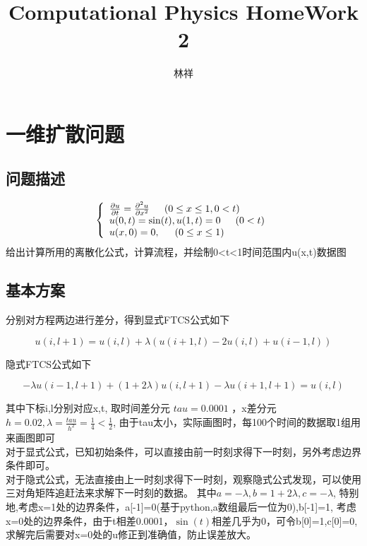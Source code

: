 \documentclass[11pt]{ctexart}
\title{Computational Physics HomeWork 2}
\author{林祥}
\begin{document}
\maketitle

\section{一维扩散问题}

\subsection{问题描述}

\begin{equation}
\left\lbrace 
\begin{array}{l}
\frac{\partial u}{\partial t}=\frac{\partial^{2}u}{\partial x^{2}} \indent (0\leq x\leq 1, 0<t)\\
u(0,t)=\sin (t),u(1,t)=0 \indent (0<t)\\
u(x,0)=0, \indent (0\leq x\leq 1) 
\end{array}
\right. 
\end{equation}
给出计算所用的离散化公式，计算流程，并绘制0<t<1时间范围内u(x,t)数据图

\subsection{基本方案}

分别对方程两边进行差分，得到显式FTCS公式如下

\begin{equation}
u(i,l+1)=u(i,l)+\lambda(u(i+1,l)-2u(i,l)+u(i-1,l))
\end{equation}

\indent 隐式FTCS公式如下

\begin{equation}
-\lambda u(i-1,l+1)+(1+2\lambda)u(i,l+1)-\lambda u(i+1,l+1)=u(i,l)
\end{equation}

\indent 其中下标i,l分别对应x,t, 取时间差分元 $ tau=0.0001 $ ，x差分元$ h=0.02 ,\lambda=\frac{tau}{h^2}=\frac{1}{4}<\frac{1}{2}$,
由于tau太小，实际画图时，每100个时间的数据取1组用来画图即可\\
\indent 对于显式公式，已知初始条件，可以直接由前一时刻求得下一时刻，另外考虑边界条件即可。\\
\indent 对于隐式公式，无法直接由上一时刻求得下一时刻，观察隐式公式发现，可以使用三对角矩阵追赶法来求解下一时刻的数据。
其中$a=-\lambda,b=1+2\lambda,c=-\lambda$,
特别地,考虑x=1处的边界条件，a[-1]=0(基于python,a数组最后一位为0),b[-1]=1,
考虑x=0处的边界条件，由于t相差0.0001，$\sin(t)$相差几乎为0，可令b[0]=1,c[0]=0,
求解完后需要对x=0处的u修正到准确值，防止误差放大。
\end{document}
